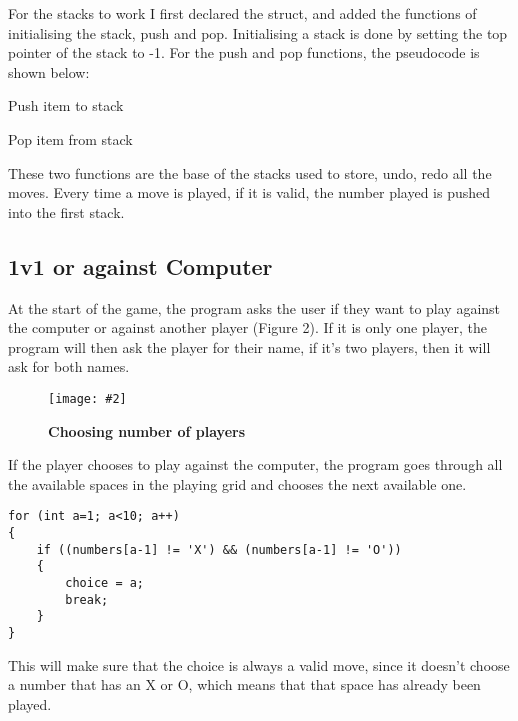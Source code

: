 \documentclass[10pt, a4paper]{article}
\newcommand{\figuremacro}[5]{
    \begin{figure}[#1]
        \centering
        \texttt{[image: \#2]}
        \caption[#3]{\textbf{#3}#4}
        \label{fig:#2}
    \end{figure}
}
\begin{document}
For the stacks to work I first declared the struct, and added the functions of initialising the stack, push and pop. Initialising a stack is done by setting the top pointer of the stack to -1. For the push and pop functions, the pseudocode is shown below:

\begin{algorithm}[h]
\caption{Push item to stack}
\end{algorithm}

\begin{algorithm}[h]
\caption{Pop item from stack}
\end{algorithm}

These two functions are the base of the stacks used to store, undo, redo all the moves. Every time a move is played, if it is valid, the number played is pushed into the first stack.

    \subsection{1v1 or against Computer}

At the start of the game, the program asks the user if they want to play against the computer or against another player (Figure 2). If it is only one player, the program will then ask the player for their name, if it's two players, then it will ask for both names.

\figuremacro{h}{players}{Choosing number of players}{}{0.9}

If the player chooses to play against the computer, the program goes through all the available spaces in the playing grid and chooses the next available one.

\begin{lstlisting}
for (int a=1; a<10; a++)
{
    if ((numbers[a-1] != 'X') && (numbers[a-1] != 'O'))
    {
        choice = a;
        break;
    }
}
\end{lstlisting}

This will make sure that the choice is always a valid move, since it doesn't choose a number that has an X or O, which means that that space has already been played.
\end{document}

